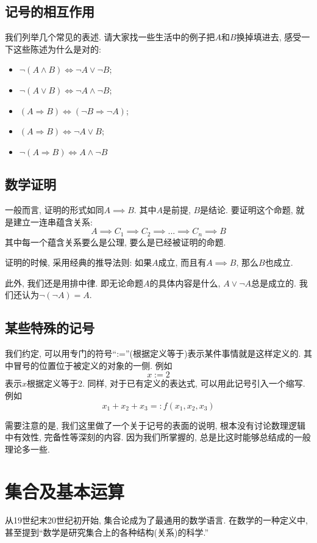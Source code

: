 \documentclass{ctexart}
\begin{document}
\subsection{记号的相互作用}

我们列举几个常见的表述. 请大家找一些生活中的例子把$A$和$B$换掉填进去, 感受一下这些陈述为什么是对的:

\begin{itemize}
    \item $\neg(A \wedge B) \Leftrightarrow \neg A \vee \neg B$;
    \item $\neg(A \vee B) \Leftrightarrow \neg A \wedge \neg B$;
    \item $(A \Rightarrow B) \Leftrightarrow(\neg B \Rightarrow \neg A)$;
    \item $(A \Rightarrow B) \Leftrightarrow \neg A \vee B$;
    \item $\neg(A \Rightarrow B) \Leftrightarrow A \wedge \neg B$
\end{itemize}

\subsection{数学证明} 一般而言, 证明的形式如同$A \implies B$. 其中$A$是前提, $B$是结论. 要证明这个命题, 就是建立一连串蕴含关系: 
\[
    A\implies C_1 \implies C_2 \implies ... \implies C_n \implies B
\]
其中每一个蕴含关系要么是公理, 要么是已经被证明的命题. 

证明的时候, 采用经典的推导法则: 如果$A$成立, 而且有$A\implies B$, 那么$B$也成立. 

此外, 我们还是用排中律. 即无论命题$A$的具体内容是什么, $A \lor \lnot A$总是成立的. 我们还认为$\lnot (\lnot A)=A$. 

\subsection{某些特殊的记号} 我们约定, 可以用专门的符号``:=''(根据定义等于)表示某件事情就是这样定义的. 其中冒号的位置位于被定义的对象的一侧. 例如
\[
    x:=2
\]
表示$x$根据定义等于2. 同样, 对于已有定义的表达式, 可以用此记号引入一个缩写. 例如
\[
    x_1+x_2+x_3=:f(x_1,x_2,x_3)
\]

需要注意的是, 我们这里做了一个关于记号的表面的说明, 根本没有讨论数理逻辑中有效性, 完备性等深刻的内容. 因为我们所掌握的, 总是比这时能够总结成的一般理论多一些. 

\section{集合及基本运算} 从19世纪末20世纪初开始, 集合论成为了最通用的数学语言. 在数学的一种定义中, 甚至提到``数学是研究集合上的各种结构(关系)的科学.''
\end{document}
